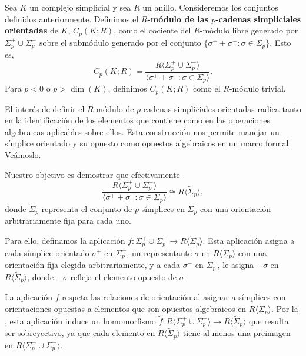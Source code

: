 \begin{definicion}
	Sea $K$ un complejo simplicial y sea $R$ un anillo. Consideremos los conjuntos
	definidos anteriormente. Definimos el \textbf{$R$-módulo de las $p$-cadenas
		simpliciales orientadas} de $K$, $C_{p}(K;R)$, como el cociente del $R$-módulo
	libre generado por $\Sigma_{p}^{+}\cup \Sigma_{p}^{-}$ sobre el submódulo
	generado por el conjunto $\{\sigma^{+}+ \sigma^{-}: \sigma \in \Sigma_{p}\}$. Esto
	es,
	\[
	C_{p}(K;R) = \frac{R\langle \Sigma_{p}^{+}\cup \Sigma_{p}^{-}\rangle}{\langle
		\sigma^{+}+ \sigma^{-}: \sigma \in \Sigma_{p}\rangle}.
	\]
	Para $p < 0$ o $p > \dim(K)$, definimos $C_{p}(K;R)$ como el $R$-módulo trivial.
\end{definicion}
El interés de definir el $R$-módulo de $p$-cadenas simpliciales orientadas radica
tanto en la identificación de los elementos que contiene como en las operaciones
algebraicas aplicables sobre ellos. Esta construcción nos permite manejar un
símplice orientado y su opuesto como opuestos algebraicos en un marco formal. Veámoslo.

Nuestro objetivo es demostrar que efectivamente
\[
\frac{R\langle \Sigma_{p}^{+}\cup \Sigma_{p}^{-}\rangle}{\langle \sigma^{+}+
	\sigma^{-}: \sigma \in \Sigma_{p}\rangle}\cong R \langle \tilde{\Sigma}_{p}\rangle
,
\]
donde $\tilde{\Sigma}_{p}$ representa el conjunto de $p$-símplices en $\Sigma_{p}$
con una orientación arbitrariamente fija para cada uno.

Para ello, definamos la aplicación
$f : \Sigma^{+}_{p}\cup \Sigma^{-}_{p}\to R \langle \tilde{\Sigma}_{p}\rangle$. Esta
aplicación asigna a cada símplice orientado $\sigma^{+}$ en $\Sigma_{p}^{+}$, un
representante $\sigma$ en $R \langle \tilde{\Sigma}_{p}\rangle$ con una
orientación fija elegida arbitrariamente, y a cada $\sigma^{-}$ en $\Sigma_{p}^{-}$,
le asigna $-\sigma$ en $R \langle \tilde{\Sigma}_{p}\rangle$, donde $-\sigma$ refleja
el elemento opuesto de $\sigma$.

La aplicación $f$ respeta las relaciones de orientación al asignar a símplices con
orientaciones opuestas a elementos que son opuestos algebraicos en $R \langle \tilde
{\Sigma}_{p}\rangle$. Por la , esta aplicación
induce un homomorfismo
$\tilde{f}: R\langle \Sigma_{p}^{+}\cup \Sigma_{p}^{-}\rangle \to R \langle \tilde
{\Sigma}_{p}\rangle$
que resulta ser sobreyectivo, ya que cada elemento en $R \langle \tilde{\Sigma}_{p}
\rangle$ tiene al menos una preimagen en $R\langle \Sigma_{p}^{+}\cup \Sigma_{p}^{-}
\rangle$.

